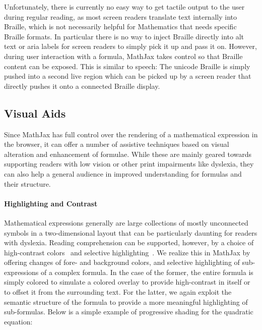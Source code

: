 \documentclass{sig-alternate}
\begin{document}
Unfortunately, there is currently no easy way to get tactile output to the user
during regular reading, as most screen readers translate text internally into
Braille, which is not necessarily helpful for Mathematics that needs specific
Braille formats. In particular there is no way to inject Braille directly into
alt text or aria labels for screen readers to simply pick it up and pass it on.
However, during user interaction with a formula, MathJax takes control so that
Braille content can be exposed. This is similar to speech: The unicode Braille
is simply pushed into a second live region which can be picked up by a screen
reader that directly pushes it onto a connected Braille display.



\subsection{Visual Aids}

Since MathJax has full control over the rendering of a mathematical expression
in the browser, it can offer a number of assistive techniques based on visual
alteration and enhancement of formulae. While these are mainly geared towards
supporting readers with low vision or other print impairments like dyslexia,
they can also help a general audience in improved understanding for formulas and
their structure.

\paragraph{Highlighting and Contrast}

Mathematical expressions generally are large collections of mostly unconnected
symbols in a two-dimensional layout that can be particularly daunting for
readers with dyslexia.  Reading comprehension can be supported, however, by a
choice of high-contrast colors~\cite{rello2012optimal} and selective
highlighting~\cite{jones2008strategies}. We realize this in MathJax by offering
changes of fore- and background colors, and selective highlighting of
sub-expressions of a complex formula. In the case of the former, the entire
formula is simply colored to simulate a colored overlay to provide high-contrast
in itself or to offset it from the surrounding text.  For the latter, we again
exploit the semantic structure of the formula to provide a more meaningful
highlighting of sub-formulas. Below is a simple example of progressive shading
for the quadratic equation:
\end{document}
